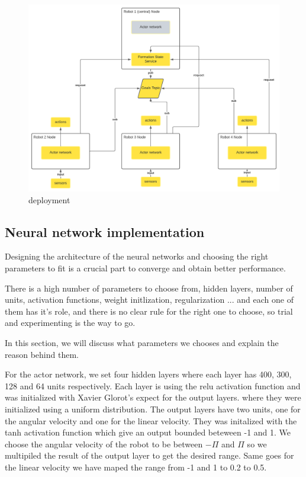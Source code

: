 \documentclass[12pt]{extarticle}
\begin{document}
 \begin{figure}[h!]  
\centering
\includegraphics[scale=1]{deployment}
\caption[deployment]{deployment}
\end{figure}










 
\newpage




\subsection{Neural network implementation}
Designing the architecture of the neural networks and choosing the right parameters to fit is a crucial part to converge and obtain better performance.

There is a high  number of  parameters to choose from,  hidden layers, number of units, activation functions, weight initlization, regularization ... and each one of them has it's role, and there is no clear rule for the right one to choose, so trial and experimenting is the way to go.

In this section, we will discuss what parameters we chooses and explain the reason behind them.

For the actor network, we set four hidden layers where each layer has 400, 300, 128 and 64 units respectively. Each layer is using the relu activation function and was initialized with Xavier Glorot's expect for the output layers. where they were initialized using a uniform distribution. The output layers have two units, one for the angular velocity and one for the linear velocity. They was initalized with the tanh activation function which give an output bounded beteween -1 and 1. We choose the angular velocity of  the robot to be between $-\Pi$ and $\Pi$ so we multipiled the result of the output layer to get the desired range. Same goes for the linear velocity we have maped the range from -1 and 1 to 0.2 to 0.5. 
\end{document}
